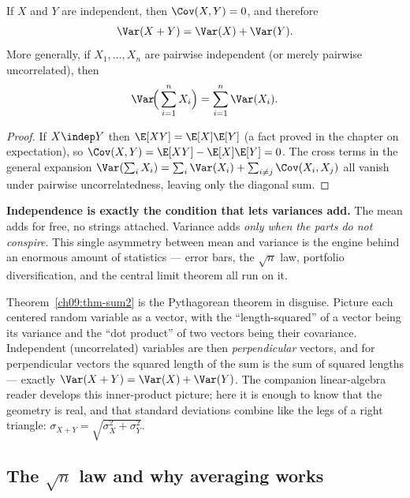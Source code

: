 \begin{corollary}
\label{ch09:cor-indepadd}
If $X$ and $Y$ are independent, then $\Cov(X,Y) = 0$, and therefore
\[
  \Var(X+Y) = \Var(X) + \Var(Y).
\]
More generally, if $X_1, \dots, X_n$ are pairwise independent (or merely
pairwise uncorrelated), then
\[
  \Var\!\Big(\sum_{i=1}^n X_i\Big) = \sum_{i=1}^n \Var(X_i).
\]
\end{corollary}

\begin{proof}
If $X \indep Y$ then $\E[XY] = \E[X]\E[Y]$ (a fact proved in the chapter on
expectation), so $\Cov(X,Y) = \E[XY] - \E[X]\E[Y] = 0$. The cross terms in
the general expansion $\Var(\sum_i X_i) = \sum_i \Var(X_i)
+ \sum_{i\ne j}\Cov(X_i,X_j)$ all vanish under pairwise uncorrelatedness,
leaving only the diagonal sum. \qedhere
\end{proof}

\begin{focusbox}
\textbf{Independence is exactly the condition that lets variances add.} The
mean adds for free, no strings attached. Variance adds \emph{only when the
parts do not conspire}. This single asymmetry between mean and variance is the
engine behind an enormous amount of statistics --- error bars, the
$\sqrt{n}$ law, portfolio diversification, and the central limit theorem all
run on it.
\end{focusbox}

\begin{connectionbox}
Theorem~\ref{ch09:thm-sum2} is the Pythagorean theorem in disguise. Picture
each centered random variable as a vector, with the ``length-squared'' of a
vector being its variance and the ``dot product'' of two vectors being their
covariance. Independent (uncorrelated) variables are then \emph{perpendicular}
vectors, and for perpendicular vectors the squared length of the sum is the
sum of squared lengths --- exactly $\Var(X+Y) = \Var(X) + \Var(Y)$. The
companion linear-algebra reader develops this inner-product picture; here it
is enough to know that the geometry is real, and that standard deviations
combine like the legs of a right triangle: $\sigma_{X+Y} =
\sqrt{\sigma_X^2 + \sigma_Y^2}$.
\end{connectionbox}

\subsection{The \texorpdfstring{$\sqrt{n}$}{sqrt(n)} law and why averaging works}

